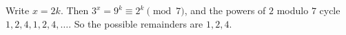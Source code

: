 Write $x=2k$. Then $3^x=9^k\equiv2^k\pmod7$, and the powers of $2$ modulo $7$ cycle $1,2,4,1,2,4,\dots$. So the possible remainders are $\boxed{1,2,4}$.
